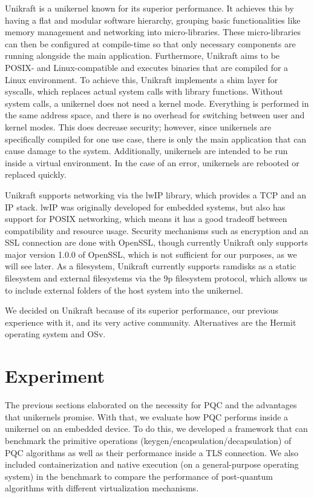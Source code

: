 \documentclass[public,noindent]{aisecreport}
\begin{document}
Unikraft \cite{Kuenzer_2021} is a unikernel known for its superior performance. It achieves this by having a flat and modular software hierarchy, grouping basic functionalities like memory management and networking into micro-libraries. These micro-libraries can then be configured at compile-time so that only necessary components are running alongside the main application. Furthermore, Unikraft aims to be POSIX- and Linux-compatible and executes binaries that are compiled for a Linux environment. To achieve this, Unikraft implements a shim layer for syscalls, which replaces actual system calls with library functions. Without system calls, a unikernel does not need a kernel mode. Everything is performed in the same address space, and there is no overhead for switching between user and kernel modes. This does decrease security; however, since unikernels are specifically compiled for one use case, there is only the main application that can cause damage to the system. Additionally, unikernels are intended to be run inside a virtual environment. In the case of an error, unikernels are rebooted or replaced quickly.

Unikraft supports networking via the lwIP library, which provides a TCP and an IP stack. lwIP was originally developed for embedded systems, but also has support for POSIX networking, which means it has a good tradeoff between compatibility and resource usage. Security mechanisms such as encryption and an SSL connection are done with OpenSSL, though currently Unikraft only supports major version 1.0.0 of OpenSSL, which is not sufficient for our purposes, as we will see later.
As a filesystem, Unikraft currently supports ramdisks as a static filesystem and external filesystems via the 9p filesystem protocol, which allows us to include external folders of the host system into the unikernel.

We decided on Unikraft because of its superior performance, our previous experience with it, and its very active community. Alternatives are the Hermit operating system and OSv.


\chapter{Experiment}

The previous sections elaborated on the necessity for PQC and the advantages that unikernels promise. With that, we evaluate how PQC performs inside a unikernel on an embedded device. To do this, we developed a framework that can benchmark the primitive operations (keygen/encapsulation/decapsulation) of PQC algorithms as well as their performance inside a TLS connection. We also included containerization and native execution (on a general-purpose operating system) in the benchmark to compare the performance of post-quantum algorithms with different virtualization mechanisms.
\end{document}
